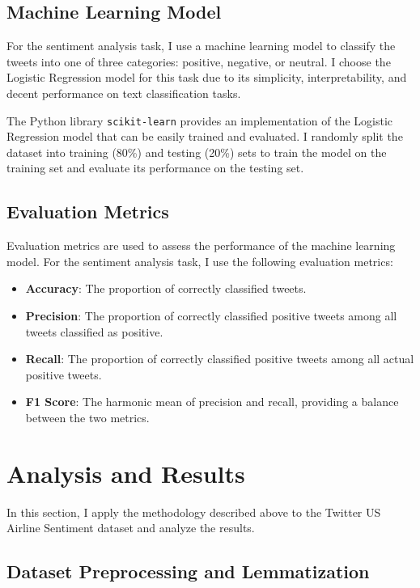 \documentclass{article}
\begin{document}
\subsection{Machine Learning Model}

For the sentiment analysis task, I use a machine learning model to classify the tweets into one of three categories: positive, negative, or neutral. I choose the Logistic Regression model for this task due to its simplicity, interpretability, and decent performance on text classification tasks.

The Python library \texttt{scikit-learn} provides an implementation of the Logistic Regression model that can be easily trained and evaluated. I randomly split the dataset into training (80\%) and testing (20\%) sets to train the model on the training set and evaluate its performance on the testing set.

\subsection{Evaluation Metrics}

Evaluation metrics are used to assess the performance of the machine learning model. For the sentiment analysis task, I use the following evaluation metrics:

\begin{itemize}
    \item \textbf{Accuracy}: The proportion of correctly classified tweets.
    \item \textbf{Precision}: The proportion of correctly classified positive tweets among all tweets classified as positive.
    \item \textbf{Recall}: The proportion of correctly classified positive tweets among all actual positive tweets.
    \item \textbf{F1 Score}: The harmonic mean of precision and recall, providing a balance between the two metrics.
\end{itemize}

\section{Analysis and Results}

In this section, I apply the methodology described above to the Twitter US Airline Sentiment dataset and analyze the results.

\subsection{Dataset Preprocessing and Lemmatization}
\end{document}
